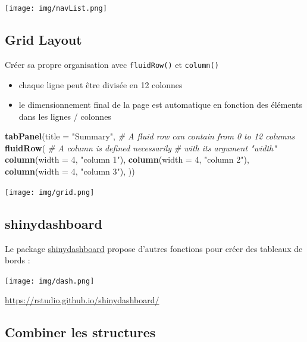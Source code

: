 \documentclass[
]{article}
\newenvironment{Shaded}{\begin{snugshade}}{\end{snugshade}}
\newcommand{\AttributeTok}[1]{\textcolor[rgb]{0.13,0.29,0.53}{#1}}
\newcommand{\CommentTok}[1]{\textcolor[rgb]{0.56,0.35,0.01}{\textit{#1}}}
\newcommand{\DecValTok}[1]{\textcolor[rgb]{0.00,0.00,0.81}{#1}}
\newcommand{\FunctionTok}[1]{\textcolor[rgb]{0.13,0.29,0.53}{\textbf{#1}}}
\newcommand{\NormalTok}[1]{#1}
\newcommand{\StringTok}[1]{\textcolor[rgb]{0.31,0.60,0.02}{#1}}
\providecommand{\tightlist}{%
  \setlength{\itemsep}{0pt}\setlength{\parskip}{0pt}}
\begin{document}
\texttt{[image: img/navList.png]}

\hypertarget{grid-layout}{%
\subsection{Grid Layout}\label{grid-layout}}

Créer sa propre organisation avec \texttt{fluidRow()} et
\texttt{column()}

\begin{itemize}
\tightlist
\item
  chaque ligne peut être divisée en 12 colonnes
\item
  le dimensionnement final de la page est automatique en fonction des
  éléments dans les lignes / colonnes
\end{itemize}

\begin{Shaded}
\begin{Highlighting}[]
\FunctionTok{tabPanel}\NormalTok{(}\AttributeTok{title =} \StringTok{"Summary"}\NormalTok{,}
         \CommentTok{\# A fluid row can contain from 0 to 12 columns}
         \FunctionTok{fluidRow}\NormalTok{(}
           \CommentTok{\# A column is defined necessarily}
           \CommentTok{\# with its argument "width"}
           \FunctionTok{column}\NormalTok{(}\AttributeTok{width =} \DecValTok{4}\NormalTok{, }\StringTok{"column 1"}\NormalTok{),}
           \FunctionTok{column}\NormalTok{(}\AttributeTok{width =} \DecValTok{4}\NormalTok{, }\StringTok{"column 2"}\NormalTok{),}
           \FunctionTok{column}\NormalTok{(}\AttributeTok{width =} \DecValTok{4}\NormalTok{, }\StringTok{"column 3"}\NormalTok{),}
\NormalTok{         ))}
\end{Highlighting}
\end{Shaded}

\texttt{[image: img/grid.png]}

\hypertarget{shinydashboard}{%
\subsection{shinydashboard}\label{shinydashboard}}

Le package
\href{https://rstudio.github.io/shinydashboard/}{shinydashboard} propose
d'autres fonctions pour créer des tableaux de bords :

\texttt{[image: img/dash.png]}

\url{https://rstudio.github.io/shinydashboard/}

\hypertarget{combiner-les-structures}{%
\subsection{Combiner les structures}\label{combiner-les-structures}}
\end{document}
